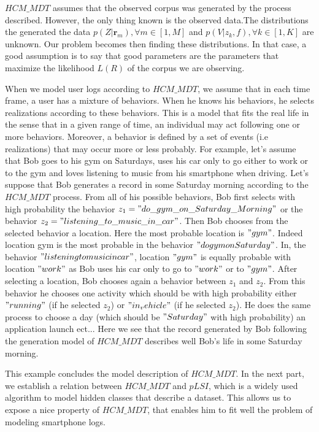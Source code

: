 $HCM\_MDT$ assumes that the observed corpus was generated by the process described. However, the only thing known is the observed data.The distributions the generated the data  $p(Z|\mathbf{r}_{m}),\forall m \in [1,M]$ and $p(V|z_{k},f), \forall k \in [1,K]$ are unknown. Our problem becomes then finding these distributions. In that case, a good assumption is to say that good parameters are the parameters that maximize the likelihood $L(R)$ of the corpus we are observing. \par

When we model user logs according to $HCM\_MDT$, we assume that in each time frame, a user has a mixture of behaviors. When he knows his behaviors, he selects realizations according to these behaviors. This is a model that fits the real life in the sense that in a given range of time, an individual may act following one or more behaviors. Moreover, a behavior is defined by a set of events (i.e realizations) that may occur more or less probably. For example, let's assume that Bob goes to his gym on Saturdays, uses his car only to go either to work or to the gym and loves listening to music from his smartphone when driving. Let's suppose that Bob generates a record in some Saturday morning according to the $HCM\_MDT$ process. From all of his possible behaviors, Bob first selects with high probability the behavior $z_{1}="do\_gym\_on\_Saturday\_Morning"$ or the behavior $z_{2}="listening\_to\_music\_in\_car"$. Then Bob chooses from the selected behavior a location. Here the most probable location is $"gym"$. Indeed location gym is the most probable in the behavior $"do gym on Saturday"$. In, the behavior $"listening to music in car"$, location $"gym"$ is equally probable with location $"work"$ as Bob uses his car only to go to $"work"$ or to $"gym"$. After selecting a location, Bob chooses again a behavior between $z_{1}$ and $z_{2}$. From this behavior he chooses one activity which should be with high probability either $"running"$ (if he selected $z_{2}$) or $"in_vehicle"$ (if he selected $z_{2}$). He does the same process to choose a day (which should be $"Saturday"$ with high probability) an application launch ect... Here we see that the record generated by Bob following the generation model of $HCM\_MDT$ describes well Bob's life in some Saturday morning. \par

This example concludes the model description of $HCM\_MDT$. In the next part, we establish a relation between $HCM\_MDT$ and $pLSI$, which is a widely used algorithm to model hidden classes that describe a dataset. This allows us to expose a nice property of $HCM\_MDT$, that enables him to fit well the problem of modeling smartphone logs.


